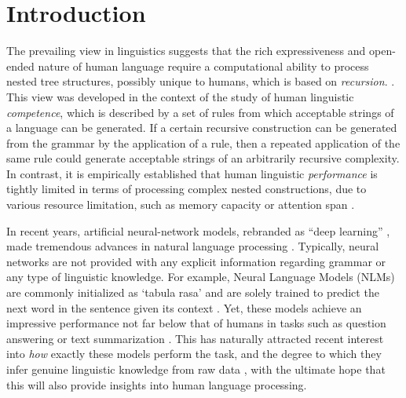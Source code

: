 \section{Introduction}
The prevailing view in linguistics suggests that the rich
expressiveness and open-ended nature of human language require a
computational ability to process nested tree structures, possibly
unique to humans, which is based on
\textit{recursion}. \citep{Chomsky:1957, Hauser:etal:2002,
  Dehaene:etal:2015}. This view was developed in the context of the
study of human linguistic \textit{competence}, which is described by a
set of rules from which acceptable strings of a language can be
generated. If a certain recursive construction can be generated from
the grammar by the application of a rule, then a repeated application
of the same rule could generate acceptable strings of an arbitrarily
recursive complexity. In contrast, it is empirically established that
human linguistic \textit{performance} is tightly limited in terms of
processing complex nested constructions, due to various resource
limitation, such as memory capacity or attention span \citep{}.

In recent years, artificial neural-network models, rebranded as ``deep learning'' \citep{LeCun:etal:2015}, made tremendous advances in natural language processing \citep{Goldberg:2017}. Typically, neural networks are not provided with any explicit information regarding grammar or any type of linguistic knowledge. For example, Neural Language Models (NLMs) are commonly initialized as `tabula rasa' and are solely trained to predict the next word in the sentence given its context \citep{Elman:1990}. Yet, these models achieve an impressive performance not far below that of humans in tasks such as question answering or text summarization \citep{Radford:etal:2019,}. This has naturally attracted recent interest into \textit{how} exactly these models perform the task, and the degree to which they infer genuine linguistic knowledge from raw data  \citep{}, with the ultimate hope that this will also provide insights into human language processing. 

